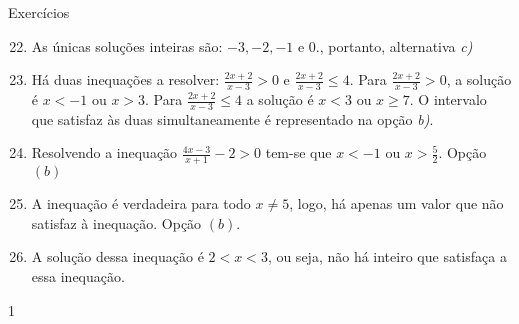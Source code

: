 \begin{answer}{Exercícios}
{\exerciselist
\begin{enumerate}\setcounter{enumi}{21}
\item As únicas soluções inteiras são: $-3, -2, -1$ e $0.$, portanto, alternativa \textit{c)}

\item Há duas inequações a resolver: $\frac{2x+2}{x-3}>0$ e $\frac{2x+2}{x-3}\leq 4$. Para $\frac{2x+2}{x-3}>0$, a solução é $x<-1$ ou $x>3$. Para $\frac{2x+2}{x-3}\leq 4$ a solução é $x<3$ ou $x\geq 7$. O intervalo que satisfaz às duas simultaneamente é representado na opção \textit{b)}.

\item Resolvendo a inequação $\frac{4x-3}{x+1}-2>0$ tem-se que $x<-1$ ou $x>\frac{5}{2}$. Opção $(b)$

\item A inequação é verdadeira para todo $x \neq 5$, logo, há apenas um valor que não satisfaz à inequação. Opção $(b)$.

\item A solução dessa inequação é $2<x<3$, ou seja, não há inteiro que satisfaça a essa inequação.
\end{enumerate}
}{1}
\end{answer}

\exercise

